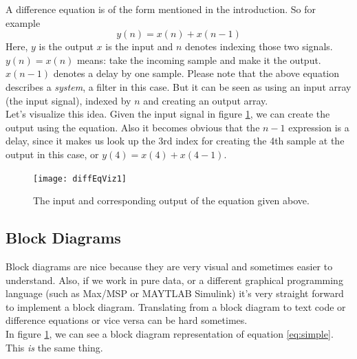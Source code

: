 A difference equation is of the form mentioned in the introduction. So for example 
\begin{equation}
	y(n) = x(n)+x(n-1)
	\label{eq:simple}
\end{equation}
Here, $y$ is the output $x$ is the input and $n$ denotes indexing those two signals.\\
$y(n)=x(n)$ means: take the incoming sample and make it the output. $x(n-1)$ denotes a delay by one sample. Please note that the above equation describes a \textit{system}, a filter in this case. But it can be seen as using an input array (the input signal), indexed by $n$ and creating an output array.\\
Let's visualize this idea. Given the input signal in figure \ref{fig:diffImpResp}, we can create the output using the equation. Also it becomes obvious that the $n-1$ expression is a delay, since it makes us look up the 3rd index for creating the 4th sample at the output in this case, or $y(4) = x(4)+x(4-1)$.
\begin{figure}[h!]
	\centering
	\texttt{[image: diffEqViz1]}
	\caption[shortCaption]
	{The input and corresponding output of the equation given above.}
	\label{fig:diffImpResp}
\end{figure}


\subsection{Block Diagrams} %
\label{sub:block}

Block diagrams are nice because they are very visual and sometimes easier to understand. Also, if we work in pure data, or a different graphical programming language (such as Max/MSP or MAYTLAB Simulink) it's very straight forward to implement a block diagram. Translating from a block diagram to text code or difference equations or vice versa can be hard sometimes.\\
In figure \ref{fig:diffImpResp}, we can see a block diagram representation of equation \ref{eq:simple}. This \textit{is} the same thing. 


